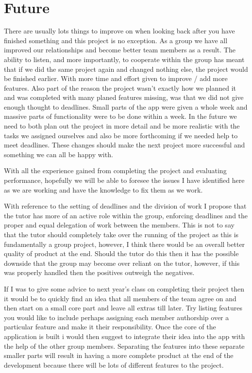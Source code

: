 \documentclass[11pt]{article}
\begin{document}
\section{Future}

There are usually lots things to improve on when looking back after you have finished something and this project is no exception. As a group we have all improved our relationships and become better team members as a result. The ability to listen, and more importantly, to cooperate within the group has meant that if we did the same project again and changed nothing else, the project would be finished earlier. With more time and effort given to improve / add more features. Also part of the reason the project wasn't exactly how we planned it and was completed with many planed features missing, was that we did not give enough thought to deadlines. Small parts of the app were given a whole week and massive parts of functionality were to be done within a week. In the future we need to both plan out the project in more detail and be more realistic with the tasks we assigned ourselves and also be more forthcoming if we needed help to meet deadlines. These changes should make the next project more successful and something we can all be happy with.

With all the experience gained from completing the project and evaluating performance, hopefully we will be able to foresee the issues I have identified here as we are working and have the knowledge to fix them as we work. 

With reference to the setting of deadlines and the division of work I propose that the tutor has more of an active role within the group, enforcing deadlines and the proper and equal delegation of work between the members. This is not to say that the tutor should completely take over the running of the project as this is fundamentally a group project, however, I think there would be an overall better quality of product at the end. Should the tutor do this then it has the possible downside that the group may become over reliant on the tutor, however, if this was properly handled then the positives outweigh the negatives.

If I was to give some advice to next year's class on completing their project then it would be to quickly find an idea that all members of the team agree on and then start on a small core part and leave all extras till later. Try listing features you would like to include perhaps assigning each member authorship over a particular feature and make it their responsibility. Once the core of the application is built i would then suggest to integrate their idea into the app with the help of the other group members. Separating the features into these separate smaller parts will result in having a more complete product at the end of the development because there will be lots of different features to the project.
\end{document}
